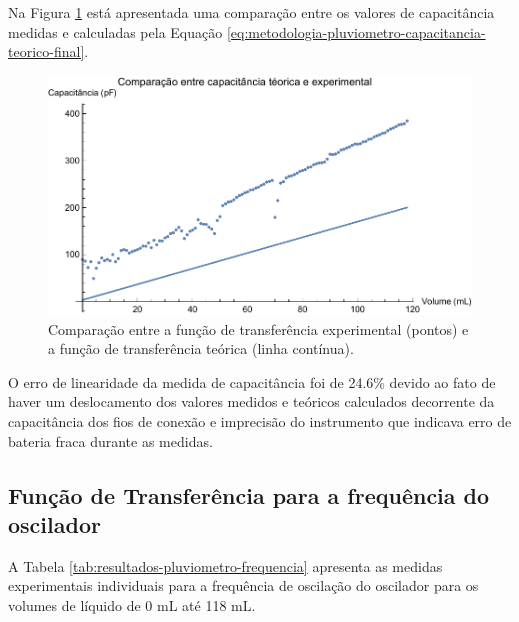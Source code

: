 \documentclass[a4paper]{instrumentacao}
\begin{document}
Na Figura \ref{fig:resultados-pluviometro-capacitancia-comparacao} está apresentada uma comparação entre os valores de capacitância medidas e calculadas pela Equação \ref{eq:metodologia-pluviometro-capacitancia-teorico-final}.

\begin{figure}[H]
	\centering \includegraphics[width=\textwidth]{Nivel/Experimental/Capacitancia-Comparacao.pdf}
	\caption{Comparação entre a função de transferência experimental (pontos) e a função de transferência teórica (linha contínua).}
	\label{fig:resultados-pluviometro-capacitancia-comparacao}
\end{figure}

O erro de linearidade da medida de capacitância foi de 24.6\% devido ao fato de haver um deslocamento dos valores medidos e teóricos calculados decorrente da capacitância dos fios de conexão e imprecisão do instrumento que indicava erro de bateria fraca durante as medidas.

\subsection{Função de Transferência para a frequência do oscilador}

A Tabela \ref{tab:resultados-pluviometro-frequencia} apresenta as medidas experimentais individuais para a frequência de oscilação do oscilador para os volumes de líquido de 0 mL até 118 mL.
\end{document}
